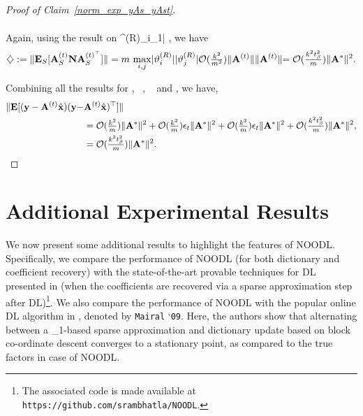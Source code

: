 \documentclass{article}
\newcommand{\siri}[1]{{\color{black}{#1}}}
\def\[#1\]{{$#1$}}
\def\b#1{{\mathbf{#1}}}
\begin{document}
\begin{proof}[Proof of Claim~\ref{norm_exp_yAs_yAst}]
\begin{align*}
	

	\end{align*}
	
	Again, using the result on \[|\vartheta^{(R)}_{i_1}| \], we have
	\begin{align*}
	\diamondsuit:=\|\b{E}_S[\b{A}^{(t)}_S\b{N}\b{A}^{(t)^\top}_S]\|  
	=  m~\underset{i,j}{\max} |\vartheta^{(R)}_i||\vartheta^{(R)}_j|\mathcal{O}(\tfrac{k^2}{m^2}) \|\b{A}^{(t)}\|\|\b{A}^{(t)}\|

	
	
	\siri{= \mathcal{O}(\tfrac{k^2t_{\beta}^2}{m})\|\b{A}^*\|^2.}
	\end{align*}
	
	
   Combining all the results for \[\clubsuit, ~\spadesuit, ~\heartsuit\] and \[\diamondsuit\], we have, 
  	\begin{align*}
  	\|\b{E}[(\b{y} - \b{A}^{(t)}\hat{\b{x}})(\b{y} - &\b{A}^{(t)}\hat{\b{x}})^\top]\|\\
  

 
  	
  	
  	& =  \siri{\mathcal{O}(\tfrac{k^2}{m})\|\b{A}^*\|^2 +  \mathcal{O}(\tfrac{k^2}{m}) \epsilon_t\|\b{A}^{*}\|^2 +  \mathcal{O}(\tfrac{k^2}{m}) \epsilon_t\|\b{A}^{*}\|^2 + \mathcal{O}(\tfrac{k^2t_{\beta}^2}{m})\|\b{A}^*\|^2,}\\

  	&=\mathcal{O}(\tfrac{k^2t_{\beta}^2}{m})\|\b{A}^*\|^2.
  	\end{align*}
  	
\end{proof}

\section{Additional Experimental Results}\label{app:additional_res}

We now present some additional results to highlight the features of NOODL. Specifically, we compare the performance of NOODL (for both dictionary and coefficient recovery) with the state-of-the-art provable techniques for DL presented in \cite{Arora15} (when the coefficients are recovered via a sparse approximation step after DL)\footnote{ The associated code is made available at \texttt{https://github.com/srambhatla/NOODL}.}. We also compare the performance of NOODL with the popular online DL algorithm in \cite{Mairal09}, denoted by {\texttt{Mairal} `\texttt{09}}. Here, the authors show that alternating between a \[\ell_1\]-based sparse approximation and dictionary update based on block co-ordinate descent converges to a stationary point, as compared to the true factors in case of NOODL.
\end{document}

